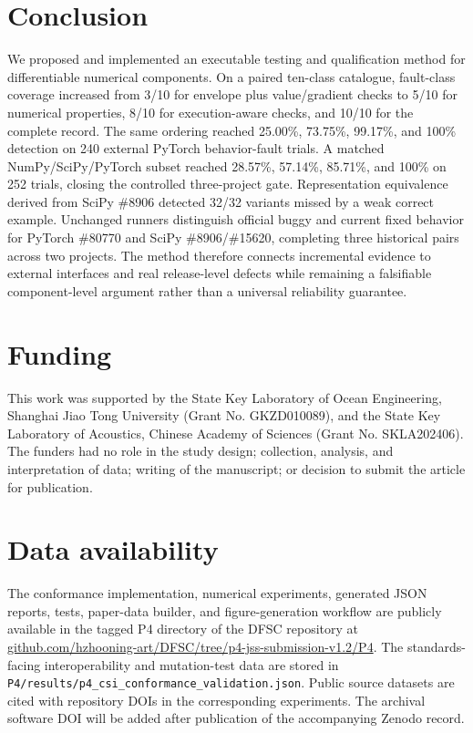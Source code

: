 \documentclass[preprint,12pt,authoryear]{elsarticle}
\begin{document}
\section{Conclusion}
We proposed and implemented an executable testing and qualification method for differentiable numerical components. On a paired ten-class catalogue, fault-class coverage increased from 3/10 for envelope plus value/gradient checks to 5/10 for numerical properties, 8/10 for execution-aware checks, and 10/10 for the complete record. The same ordering reached 25.00\%, 73.75\%, 99.17\%, and 100\% detection on 240 external PyTorch behavior-fault trials. A matched NumPy/SciPy/PyTorch subset reached 28.57\%, 57.14\%, 85.71\%, and 100\% on 252 trials, closing the controlled three-project gate. Representation equivalence derived from SciPy \#8906 detected 32/32 variants missed by a weak correct example. Unchanged runners distinguish official buggy and current fixed behavior for PyTorch \#80770 and SciPy \#8906/\#15620, completing three historical pairs across two projects. The method therefore connects incremental evidence to external interfaces and real release-level defects while remaining a falsifiable component-level argument rather than a universal reliability guarantee.

\section*{Funding}
This work was supported by the State Key Laboratory of Ocean Engineering, Shanghai Jiao Tong University (Grant No. GKZD010089), and the State Key Laboratory of Acoustics, Chinese Academy of Sciences (Grant No. SKLA202406). The funders had no role in the study design; collection, analysis, and interpretation of data; writing of the manuscript; or decision to submit the article for publication.

\section*{Data availability}
The conformance implementation, numerical experiments, generated JSON reports, tests, paper-data builder, and figure-generation workflow are publicly available in the tagged P4 directory of the DFSC repository at \href{https://github.com/hzhooning-art/DFSC/tree/p4-jss-submission-v1.2/P4}{github.com/hzhooning-art/DFSC/tree/p4-jss-submission-v1.2/P4}. The standards-facing interoperability and mutation-test data are stored in \texttt{P4/results/p4\_csi\_conformance\_validation.json}. Public source datasets are cited with repository DOIs in the corresponding experiments. The archival software DOI will be added after publication of the accompanying Zenodo record.
\end{document}
